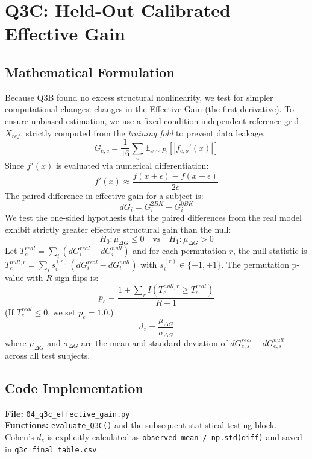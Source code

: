 \documentclass{article}
\begin{document}
\section{Q3C: Held-Out Calibrated Effective Gain}
\subsection{Mathematical Formulation}
Because Q3B found no excess structural nonlinearity, we test for simpler computational changes: changes in the Effective Gain (the first derivative). To ensure unbiased estimation, we use a fixed condition-independent reference grid $X_{ref}$, strictly computed from the \textit{training fold} to prevent data leakage.
\begin{equation}
G_{e,c} = \frac{1}{16} \sum_o \mathbb{E}_{x \sim P_c} \left[ |f_{e,o}'(x)| \right]
\end{equation}
Since $f'(x)$ is evaluated via numerical differentiation:
\begin{equation}
f'(x) \approx \frac{f(x+\epsilon) - f(x-\epsilon)}{2\epsilon}
\end{equation}
The paired difference in effective gain for a subject is:
\begin{equation}
dG_i = G_{i}^{2BK} - G_{i}^{0BK}
\end{equation}
We test the one-sided hypothesis that the paired differences from the real model exhibit strictly greater effective structural gain than the null:
\begin{equation}
H_0: \mu_{\Delta G} \le 0 \quad \text{vs} \quad H_1: \mu_{\Delta G} > 0
\end{equation}
Let $T^{real}_e = \sum_i (dG_i^{real} - dG_i^{null})$ and for each permutation $r$, the null statistic is $T^{null,r}_e = \sum_i s_i^{(r)} (dG_i^{real} - dG_i^{null})$ with $s_i^{(r)} \in \{-1, +1\}$. The permutation p-value with $R$ sign-flips is:
\begin{equation}
p_e = \frac{1 + \sum_r I(T^{null,r}_e \ge T^{real}_e)}{R + 1}
\end{equation}
(If $T^{real}_e \le 0$, we set $p_e = 1.0$.)
\begin{equation}
d_z = \frac{\mu_{\Delta G}}{\sigma_{\Delta G}}
\end{equation}
where $\mu_{\Delta G}$ and $\sigma_{\Delta G}$ are the mean and standard deviation of $dG_{e,s}^{real} - dG_{e,s}^{null}$ across all test subjects.

\subsection{Code Implementation}
\textbf{File:} \texttt{04\_q3c\_effective\_gain.py} \\
\textbf{Functions:} \texttt{evaluate\_Q3C()} and the subsequent statistical testing block. \\
Cohen's $d_z$ is explicitly calculated as \texttt{observed\_mean / np.std(diff)} and saved in \texttt{q3c\_final\_table.csv}.
\end{document}
